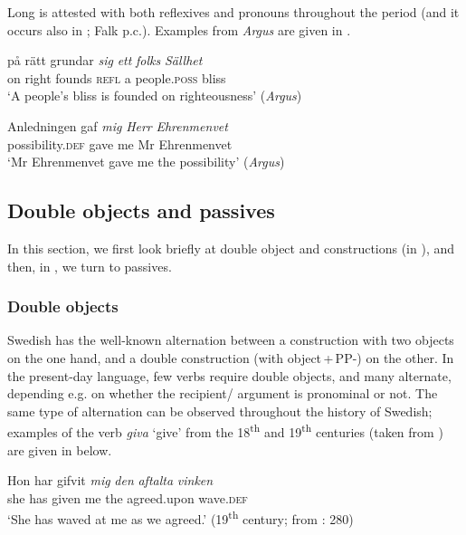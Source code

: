 \documentclass[output=paper]{langscibook}
\begin{document}
\z
\z


Long  is attested with both reflexives and pronouns throughout the  period (and it occurs also in ; Falk p.c.). Examples from \textit{Argus} are given in .


\ea \label{ex:intro:21}
\ea
\gll  på rätt   grundar \textit{sig} \textit{ett} \textit{folks} \textit{Sällhet} \\
    on right founds    \textsc{refl}   a   people\textsc{.poss}   bliss\\
    \glt `A people’s bliss is founded on righteousness’ (\textit{Argus})

\ex
\gll  Anledningen     gaf \textit{mig} \textit{Herr} \textit{Ehrenmenvet}  \\
       possibility.\textsc{def}  gave   me   Mr  Ehrenmenvet\\
    \glt `Mr Ehrenmenvet gave me the possibility’ (\textit{Argus})
\z
\z

\subsection{Double objects and passives}\label{sec:intro:3.3}


In this section, we first look briefly at double object and  constructions (in ), and then, in , we turn to passives.


\subsubsection{Double objects}\label{sec:intro:3.3.1}


Swedish has the well-known alternation between a construction with two objects on the one hand, and a double  construction (with object\,+\,PP-) on the other. In the present-day language, few verbs require double objects, and many alternate, depending e.g. on whether the recipient/ argument is pronominal or not. The same type of alternation can be observed throughout the history of Swedish; examples of the verb \textit{giva} ‘give’ from the 18\textsuperscript{th} and 19\textsuperscript{th} centuries (taken from \citealt{Valdeson2016}) are given in  below.


\ea \label{ex:intro:22}
\ea \label{ex:intro:22a}
\gll  Hon har gifvit \textit{mig} \textit{den} \textit{aftalta} \textit{vinken} \\      
     she   has given   me   the   agreed.upon  wave.\textsc{def}\\
     \glt ‘She has waved at me as we agreed.’ (19\textsuperscript{th} century; from \citealt{Valdeson2016}: 280) 
\end{document}
